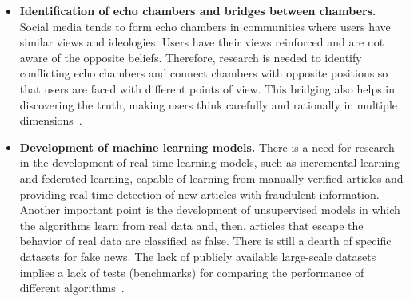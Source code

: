\documentclass{ieeeaccess}
\begin{document}
\begin{itemize}

    \item{\bf Identification of echo chambers and bridges between chambers.} Social media tends to form echo chambers in communities where users have similar views and ideologies. Users have their views reinforced and are not aware of the opposite beliefs. Therefore, research is needed to identify conflicting echo chambers and connect chambers with opposite positions so that users are faced with different points of view. This bridging also helps in discovering the truth, making users think carefully and rationally in multiple dimensions~\cite{meel2020}.

    
    \item {\bf Development of machine learning models.} There is a need for research in the development of real-time learning models, such as incremental learning and federated learning, capable of learning from manually verified articles and providing real-time detection of new articles with fraudulent information. Another important point is the development of unsupervised models in which the algorithms learn from real data and, then, articles that escape the behavior of real data are classified as false. There is still a dearth of specific datasets for fake news. The lack of publicly available large-scale datasets implies a lack of tests (benchmarks) for comparing the performance of different algorithms~\cite{meel2020}.
    

\end{itemize}
\end{document}
